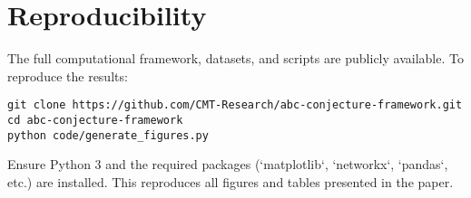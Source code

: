 \documentclass[11pt,a4paper]{article}
\begin{document}
\section*{Reproducibility}
The full computational framework, datasets, and scripts are publicly available. To reproduce the results:

\begin{verbatim}
git clone https://github.com/CMT-Research/abc-conjecture-framework.git
cd abc-conjecture-framework
python code/generate_figures.py
\end{verbatim}

Ensure Python 3 and the required packages (`matplotlib`, `networkx`, `pandas`, etc.) are installed. This reproduces all figures and tables presented in the paper.



\end{document}
